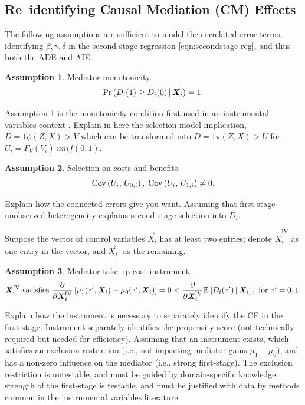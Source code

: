 \subsection{Re--identifying Causal Mediation (CM) Effects}
The following assumptions are sufficient to model the correlated error terms, identifying $\beta, \gamma, \delta$ in the second-stage regression \eqref{eqn:secondstage-reg}, and thus both the ADE and AIE.
\theoremstyle{definition}
\newtheorem{assumptionCF}{Assumption}
\renewcommand\theassumptionCF{CF--\arabic{assumptionCF}}
\begin{assumptionCF}
    \label{cf:monotonicity}
    Mediator monotonicity.
    \[ \Pr\left(  D_i(1) \geq D_i(0)  \, \middle\vert \, \boldsymbol{\mathit{X}}_i \right) = 1. \]
\end{assumptionCF}

Assumption \ref{cf:monotonicity} is the monotonicity condition first used in an instrumental variables context \citep{imbens1994identification}.
Explain in here the selection model implication, $D = 1{ \phi(Z, X) > V }$ which can be transformed into $D = 1{ \pi(Z, X) > U }$ for $U_i = F_V(V_i) ~ unif(0, 1)$.

\begin{assumptionCF}
    \label{cf:identification}
    Selection on costs and benefits.
    \[ \text{Cov} \left( U_i, \, U_{0,i} \right), \; \text{Cov} \left( U_i, \, U_{1,i} \right) \neq 0. \]
\end{assumptionCF}

Explain how the connected errors give you want.
Assuming that first-stage unobserved heterogeneity explains second-stage selection-into-$D_i$.

Suppose the vector of control variables $\vec X_i$ has at least two entries;
denote $\vec X_i^{\text{IV}}$ as one entry in the vector, and $\vec X_i^-$ as the remaining.
\begin{assumptionCF}
    \label{cf:instrument}
    Mediator take-up cost instrument.
    \[ \boldsymbol{\mathit{X}}_i^{\text{IV}} \textnormal{ satisfies }
    \frac{\partial}{\partial\boldsymbol{\mathit{X}}_i^{\text{IV}}}\left[
        \mu_1(z', \boldsymbol{\mathit{X}}_i) - \mu_0(z', \boldsymbol{\mathit{X}}_i)\right] = 0
        < \frac{\partial}{\partial\boldsymbol{\mathit{X}}_i^{\text{IV}}}\mathbb{E}_{} \left[ D_i(z') \, \middle\vert \, \boldsymbol{\mathit{X}}_i \right],
        \textnormal{ for } z' = 0, 1. \]
\end{assumptionCF}

Explain how the instrument is necessary to separately identify the CF in the first-stage.
Instrument separately identifies the propensity score (not technically required but needed for efficiency).
Assuming that an instrument exists, which satisfies an exclusion restriction (i.e., not impacting mediator gains $\mu_1-\mu_0$), and has a non-zero influence on the mediator (i.e., strong first-stage).
The exclusion restriction is untestable, and must be guided by domain-specific knowledge; strength of the first-stage is testable, and must be justified with data by methods common in the instrumental variables literature.

